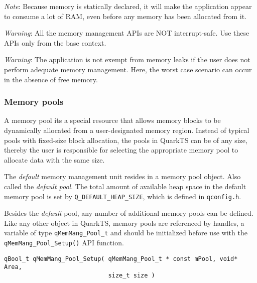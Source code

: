 

\begin{tcolorbox}
\ArrowBoldDownRight \textit{Note}: Because memory is statically declared, it will make the application appear to consume a lot of RAM, even before any memory has been allocated from it.
\end{tcolorbox}

\begin{tcolorbox}
\AsteriskBold \textit{Warning}: All the memory management APIs are NOT interrupt-safe. Use these APIs only from the base context.
\end{tcolorbox}

\begin{tcolorbox}
\AsteriskBold \textit{Warning}: The application is not exempt from memory leaks if the user does not perform adequate memory management. Here, the worst case scenario can occur in the absence of free memory. 
\end{tcolorbox}

\subsubsection{Memory pools}

A memory pool its a special resource that allows memory blocks to be dynamically allocated from a user-designated memory region. Instead of typical pools with fixed-size block allocation, the pools in QuarkTS can be of any size, thereby the user is responsible for selecting the appropriate memory pool to allocate data with the same size. 

The \textit{default} memory management unit resides in a memory pool object. Also called the \textit{default pool}. The total amount of available heap space in the default memory pool is set by \lstinline{Q_DEFAULT_HEAP_SIZE}, which is defined in \lstinline{qconfig.h}.

Besides the \textit{default} pool, any number of additional memory pools can be defined. Like any other object in QuarkTS, memory pools are referenced by handles, a variable of type \lstinline{qMemMang_Pool_t}  and should be initialized before use with the \lstinline{qMemMang_Pool_Setup()}  API function.
\medskip

\begin{lstlisting}[style=CStyle]
qBool_t qMemMang_Pool_Setup( qMemMang_Pool_t * const mPool, void* Area, 
                             size_t size )
\end{lstlisting}

